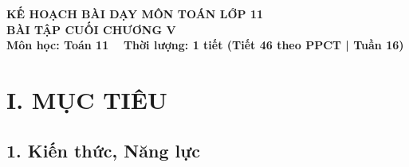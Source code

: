 \documentclass[12pt, a4paper]{article}
\begin{document}
\begin{center}
    {\fontsize{14pt}{17pt}\selectfont \textbf{KẾ HOẠCH BÀI DẠY MÔN TOÁN LỚP 11}}\\[6pt]
    {\fontsize{16pt}{19pt}\selectfont \textbf{BÀI TẬP CUỐI CHƯƠNG V}}\\[4pt]
    {\fontsize{12pt}{15pt}\selectfont \textbf{Môn học: Toán 11} \ \textbar \ \textbf{Thời lượng: 1 tiết (Tiết 46 theo PPCT | Tuần 16)}}
\end{center}

\vspace{5pt}

\section*{I. MỤC TIÊU}

\subsection*{1. Kiến thức, Năng lực}
\end{document}
